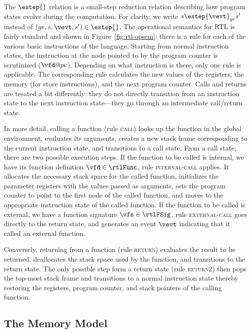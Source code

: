 The $\estep{}$ relation is a small-step reduction relation describing how program states evolve
during the computation.  For clarity, we write $s \estep{\vevt}_{ge} s'$ instead of
$(ge,s,\vevt,s')\in {\estep{}}$.  The operational semantics for RTL is fairly standard and shown in
Figure~\ref{fig:rtl-opsem}: there is a rule for each of the various basic instructions of the
language.  Starting from normal instruction states, the instruction at the node pointed to by the
program counter is scrutinized ($\vfd@pc$).  Depending on what instruction is there, only one rule
is applicable.  The corresponding rule calculates the new values of the registers, the memory (for
store instructions), and the next program counter.  Calls and returns are treated a bit differently:
they do not directly transition from an instruction state to the next instruction state---they go
through an intermediate call/return state.

In more detail, calling a function (rule \textsc{call}) looks up the function in the global
environment, evaluates its arguments, creates a new stack frame corresponding to the current
instruction state, and transitions to a call state.  From a call state, there are two possible
execution steps.  If the function to be called is internal, \ie we have its function definition
$\vfd\in\rtlFunc$, rule \textsc{internal-call} applies.  It allocates the necessary stack space for
the called function, initializes the parameter registers with the values passed as arguments, sets
the program counter to point to the first node of the called function, and moves to the appropriate
instruction state of the called function.  If the function to be called is external, \ie we have a
function signature $\vfs\in\rtlFSig$, rule \textsc{external-call} goes directly to the return state,
and generates an event $\vevt$ indicating that it called an external function.

Conversely, returning from a function (rule \textsc{return}) evaluates the result to be returned,
deallocates the stack space used by the function, and transitions to the return state.  The only
possible step form a return state (rule \textsc{return2}) then pops the top-most stack frame and
transitions to a normal instruction state thereby restoring the registers, program counter, and
stack pointers of the calling function.



\subsection{The Memory Model}
\label{sec:background:memory}

